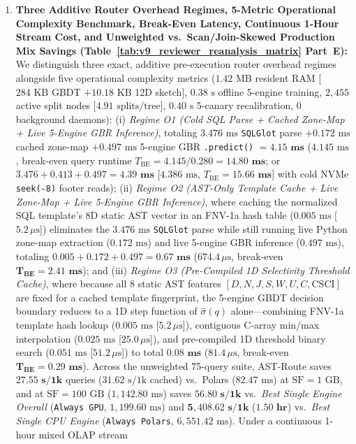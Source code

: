 \documentclass[10pt,a4paper]{article}
\begin{document}
\begin{enumerate}[leftmargin=1.5em,itemsep=0.8pt]
($76.18\text{ ms}$) and 12D catalog sketches + Mondrian stratification (which restore external coverage to $\mathbf{89.39\%\text{--}91.89\%}$ across JOB 12D $[74.53\%, 96.04\%]$, SSB+ClickBench $[76.43\%, 96.86\%]$, TPC-DS-derived $[75.09\%, 96.72\%]$, and BIRD-inspired $[71.69\%, 97.67\%]$).
    \item \textbf{Three Additive Router Overhead Regimes, 5-Metric Operational Complexity Benchmark, Break-Even Latency, Continuous 1-Hour Stream Cost, and Unweighted vs.\ Scan/Join-Skewed Production Mix Savings (Table~\ref{tab:v9_reviewer_reanalysis_matrix} Part~E):} We distinguish three exact, additive pre-execution router overhead regimes alongside five operational complexity metrics ($1.42\text{ MB}$ resident RAM [$284\text{ KB}$ GBDT $+ 10.18\text{ KB}$ 12D sketch], $0.38\text{ s}$ offline 5-engine training, $2{,}455$ active split nodes [$4.91\text{ splits/tree}$], $0.40\text{ s}$ 5-canary recalibration, $0$ background daemons): (i) \emph{Regime O1 (Cold SQL Parse + Cached Zone-Map + Live 5-Engine GBR Inference)}, totaling $3.476\text{ ms}$ \texttt{SQLGlot} parse $+ 0.172\text{ ms}$ cached zone-map $+ 0.497\text{ ms}$ 5-engine GBR \texttt{.predict()} $= \mathbf{4.15\text{ ms}}$ ($4.145\text{ ms}$, break-even query runtime $T_{\text{BE}}=4.145/0.280=\mathbf{14.80\text{ ms}}$; or $3.476 + 0.413 + 0.497 = \mathbf{4.39\text{ ms}}$ [$4.386\text{ ms}$, $T_{\text{BE}}=\mathbf{15.66\text{ ms}}$] with cold NVMe \texttt{seek(-8)} footer reads); (ii) \emph{Regime O2 (AST-Only Template Cache + Live Zone-Map + Live 5-Engine GBR Inference)}, where caching the normalized SQL template's 8D static AST vector in an FNV-1a hash table ($0.005\text{ ms}$ [$5.2\,\mu\text{s}$]) eliminates the $3.476\text{ ms}$ \texttt{SQLGlot} parse while still running live Python zone-map extraction ($0.172\text{ ms}$) and live 5-engine GBR inference ($0.497\text{ ms}$), totaling $0.005 + 0.172 + 0.497 = \mathbf{0.67\text{ ms}}$ ($674.4\,\mu\text{s}$, break-even $\mathbf{T_{\text{BE}}=2.41\text{ ms}}$); and (iii) \emph{Regime O3 (Pre-Compiled 1D Selectivity Threshold Cache)}, where because all 8 static AST features $[D,N,J,S,W,U,C,\text{CSCI}]$ are fixed for a cached template fingerprint, the 5-engine GBDT decision boundary reduces to a 1D step function of $\hat{\sigma}(q)$ alone---combining FNV-1a template hash lookup ($0.005\text{ ms}$ [$5.2\,\mu\text{s}$]), contiguous C-array min/max interpolation ($0.025\text{ ms}$ [$25.0\,\mu\text{s}$]), and pre-compiled 1D threshold binary search ($0.051\text{ ms}$ [$51.2\,\mu\text{s}$]) to total $\mathbf{0.08\text{ ms}}$ ($81.4\,\mu\text{s}$, break-even $\mathbf{T_{\text{BE}}=0.29\text{ ms}}$). Across the unweighted 75-query suite, AST-Route saves $\mathbf{27.55\text{ s}/1\text{k}}$ queries ($31.62\text{ s}/1\text{k}$ cached) vs.\ Polars ($82.47\text{ ms}$) at $\text{SF}=1\text{ GB}$, and at $\text{SF}=100\text{ GB}$ ($1{,}142.80\text{ ms}$) saves $\mathbf{56.80\text{ s}/1\text{k}}$ vs.\ \emph{Best Single Engine Overall} (\texttt{Always GPU}, $1{,}199.60\text{ ms}$) and $\mathbf{5{,}408.62\text{ s}/1\text{k}}$ ($\mathbf{1.50\text{ hr}}$) vs.\ \emph{Best Single CPU Engine} (\texttt{Always Polars}, $6{,}551.42\text{ ms}$). Under a continuous 1-hour mixed OLAP stream 
\end{enumerate}
\end{document}
